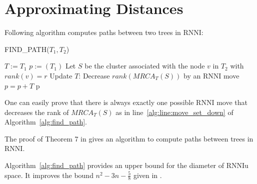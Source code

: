 \documentclass[11pt, a4paper]{article}
\newcommand{\rnni}{\mathrm{RNNI}}
\newcommand{\rnniu}{\mathrm{RNNIu}}
\newtheorem{conjecture}[definition]{Conjecture}
\begin{document}
%


\section{Approximating Distances}

Following algorithm computes paths between two trees in $\rnni$:

\begin{algorithm}[H]
\caption{FIND\_PATH($T_1,T_2$)}
\label{alg:find_path}
\begin{algorithmic}[1]
	\STATE $T := T_1$
	\STATE $p := (T_1)$
		\STATE Let $S$ be the cluster associated with the node $v$ in $T_2$ with $rank(v) = r$
			\STATE Update $T$: Decrease $rank(MRCA_T(S))$ by an $\rnni$ move \label{alg:line:move_set_down}
			\STATE $p = p+T$
		\ENDWHILE
	\ENDFOR
	\RETURN p
\end{algorithmic}
\end{algorithm}

One can easily prove that there is always exactly one possible $\rnni$ move that decreases the rank of $MRCA_T(S)$ as in line~\ref{alg:line:move_set_down} of Algorithm~\ref{alg:find_path}.

The proof of Theorem 7 in \cite{Gavryushkin2017} gives an algorithm to compute paths between trees in $\rnni$.



Algorithm~\ref{alg:find_path} provides an upper bound for the diameter of $\rnniu$ space.
It improves the bound $n^2 - 3n - \frac{5}{8}$ given in \cite{Gavryushkin2017}.
\end{document}
